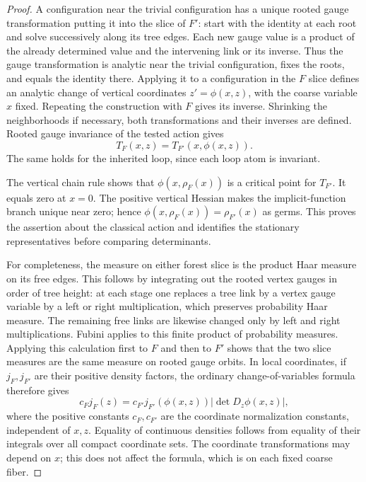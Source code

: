 \begin{proof}
A configuration near the trivial configuration has a unique rooted gauge
transformation putting it into the slice of $F'$: start with the identity
at each root and solve successively along its tree edges. Each new gauge
value is a product of the already determined value and the intervening link
or its inverse. Thus the gauge transformation is analytic near the trivial
configuration, fixes the roots, and equals the identity there. Applying it
to a configuration in the $F$ slice defines an analytic change of vertical
coordinates $z'=\phi(x,z)$, with the coarse variable $x$ fixed. Repeating
the construction with $F$ gives its inverse. Shrinking the neighborhoods
if necessary, both transformations and their inverses are defined. Rooted
gauge invariance of the tested action gives
\[
       T_F(x,z)=T_{F'}(x,\phi(x,z)).
\]
The same holds for the inherited loop, since each loop atom is invariant.

The vertical chain rule shows that $\phi(x,\rho_F(x))$ is a critical
point for $T_{F'}$. It equals zero at $x=0$. The positive vertical Hessian
makes the implicit-function branch unique near zero; hence
$\phi(x,\rho_F(x))=\rho_{F'}(x)$ as germs. This proves the assertion
about the classical action and identifies the stationary representatives
before comparing determinants.

For completeness, the measure on either forest slice is the product Haar
measure on its free edges. This follows by integrating out the rooted
vertex gauges in order of tree height: at each stage one replaces a tree
link by a vertex gauge variable by a left or right multiplication, which
preserves probability Haar measure. The remaining free links are likewise
changed only by left and right multiplications. Fubini applies to this
finite product of probability measures. Applying this calculation first
to $F$ and then to $F'$ shows that the two slice measures are the same
measure on rooted gauge orbits. In local coordinates, if $j_F,j_{F'}$
are their positive density factors, the ordinary change-of-variables
formula therefore gives
\[
 c_Fj_F(z)=c_{F'}j_{F'}(\phi(x,z))
                     |\det D_z\phi(x,z)|,
\]
where the positive constants $c_F,c_{F'}$ are the coordinate normalization
constants, independent of $x,z$. Equality of continuous densities follows
from equality of their integrals over all compact coordinate sets. The
coordinate transformations may depend on $x$; this does not affect the
formula, which is on each fixed coarse fiber.


\end{proof}
